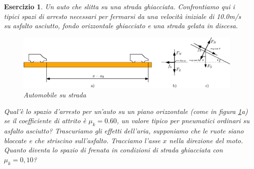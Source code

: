 \documentclass{article}
\newtheorem{es}{Esercizio}[section]
\begin{document}
\clearpage
\begin{es}
  Un auto che slitta su una strada ghiacciata. Confrontiamo qui i tipici spazi di arresto necessari per fermarsi da una velocità iniziale di 10.0m/s su asfalto asciutto, fondo orizzontale ghiacciato e una strada gelata in discesa.
  \begin{figure}[ht!]
    \centering
    \includegraphics[scale=0.9]{img/auto.eps}
    \caption{Automobile su strada}
    \label{fig:autosust}
  \end{figure}
  \begin{tasks}
    \task Qual'è lo spazio d'arresto per un'auto su un piano orizzontale (come in figura \ref{fig:autosust}a) se il coefficiente di attrito è $\mu_k=0.60$, un valore tipico per pneumatici ordinari su asfalto asciutto? Trascuriamo gli effetti dell'aria, supponiamo che le ruote siano bloccate e che striscino sull'asfalto. Tracciamo l'asse $x$ nella direzione del moto.
    \task Quanto diventa lo spazio di frenata in condizioni di strada ghiacciata con $\mu_k=0,10$?
  \end{tasks}
\end{es}
\end{document}
